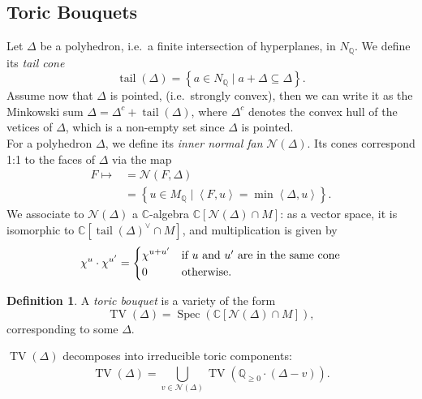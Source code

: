 \documentclass[a4paper]{article}
\DeclareMathOperator{\TV}{TV}
\DeclareMathOperator{\tail}{tail}
\DeclareMathOperator{\Specc}{Spec}
\theoremstyle{definition}
\newtheorem{definition}[theorem]{Definition}
\begin{document}
  \subsection{Toric Bouquets}
  Let $\Delta$ be a polyhedron, i.e.~a finite intersection of hyperplanes, in $N_{\mathbb{Q}}$. We define its \emph{tail cone} 
  \[
    \tail \left( \Delta \right) = \left\{a \in N_{\mathbb{Q}} \mid a + \Delta \subseteq \Delta\right\}.
  \]
  Assume now that $\Delta$ is pointed, (i.e.~strongly convex), then we can write it as the Minkowski sum  $\Delta = \Delta ^{c} + \tail \left( \Delta \right)$, where $\Delta ^{c}$ denotes the convex hull of the vetices of $\Delta$, which is a non-empty set since $\Delta $ is pointed.\\
  For a polyhedron $\Delta$, we define its \emph{inner normal fan} $\mathcal{N} \left( \Delta \right)$. Its cones correspond 1:1 to the faces of $\Delta$ via the map
  \begin{align*}
    F \mapsto &= \mathcal{N} \left( F, \Delta \right) \\
              &= \left\{u \in M_{\mathbb{Q}} \mid \left\langle F, u \right\rangle = \min \left\langle \Delta, u \right\rangle\right\}.
  \end{align*}
  We associate to $\mathcal{N} \left( \Delta \right)$ a $\mathbb{C}$-algebra $\mathbb{C} \left[ \mathcal{N} \left( \Delta \right) \cap M \right]$: as a vector space, it is isomorphic to $\mathbb{C} \left[ \tail \left( \Delta \right)^{\vee}  \cap M \right]$, and multiplication is given by
  \[
    \chi^{u} \cdot \chi^{u'} = 
    \begin{dcases*}
      \chi^{u + u'} & if $u$ and $u'$ are in the same cone\\
      0 & otherwise.
    \end{dcases*}
  \]
  \begin{definition}
    A \emph{toric bouquet} is a variety of the form
    \[
      \TV \left( \Delta \right) = \Specc \left( \mathbb{C} \left[ \mathcal{N} \left( \Delta \right) \cap M \right] \right),
    \]
   corresponding to some $\Delta$.
  \end{definition}
  $\TV \left( \Delta \right)$ decomposes into irreducible toric components:
  \[
    \TV \left( \Delta \right) = \bigcup_{v \in \mathcal{N} \left( \Delta \right) }^{} \TV \left( \mathbb{Q}_{\geq 0} \cdot \left( \Delta - v \right) \right).
  \]
\end{document}
